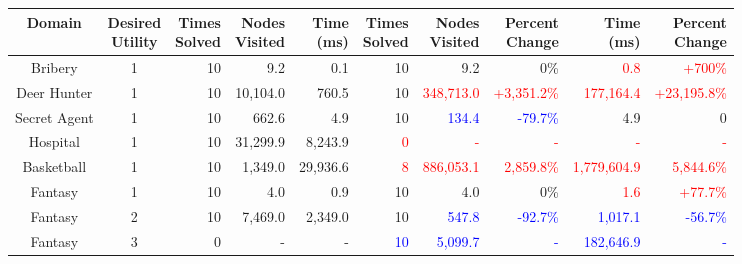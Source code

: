 \documentclass[letterpaper]{article} %
\begin{document}
\begin{table}[t]
\begin{tabular}{|c c | r r r | r r r r r |}
 \hline
 Domain & \shortstack{Desired \\Utility} & \shortstack{Times \\ Solved} & \shortstack{Nodes \\ Visited} & \shortstack{Time \\ (ms)} & \shortstack{Times \\ Solved} & \shortstack{Nodes \\ Visited} & \shortstack{Percent \\ Change} & \shortstack{Time \\ (ms)}  &  \shortstack{Percent \\ Change}\\ [0.5ex] 
 \hline\hline
 
 Bribery & 1 & 10 & 9.2 & 0.1 & 10 & 9.2 & 0\% & \textcolor{red}{0.8} & \textcolor{red}{+700\%} \\ 
 \hline
 
 Deer Hunter & 1 & 10 & 10,104.0 & 760.5 & 10 & \textcolor{red}{348,713.0} & \textcolor{red}{+3,351.2\%} & \textcolor{red}{177,164.4} & \textcolor{red}{+23,195.8\%} \\
 \hline
 
 Secret Agent & 1 & 10 & 662.6 & 4.9 & 10 & \textcolor{blue}{134.4} & \textcolor{blue}{-79.7\%} & 4.9 & 0 \\
 \hline
 
 Hospital & 1 & 10 & 31,299.9 & 8,243.9 & \textcolor{red}{0} & \textcolor{red}{-} & \textcolor{red}{-} & \textcolor{red}{-} & \textcolor{red}{-}\\
 \hline
 
 Basketball & 1 & 10 & 1,349.0 & 29,936.6 & \textcolor{red}{8} & \textcolor{red}{886,053.1} & \textcolor{red}{2,859.8\%} & \textcolor{red}{1,779,604.9} & \textcolor{red}{5,844.6\%}\\
 \hline
 
 Fantasy & 1 & 10 & 4.0 & 0.9 & 10 & 4.0 & 0\% & \textcolor{red}{1.6} & \textcolor{red}{+77.7\%} \\
 \hline
 
 Fantasy & 2 & 10 & 7,469.0 & 2,349.0 & 10 & \textcolor{blue}{547.8} & \textcolor{blue}{-92.7\%} & \textcolor{blue}{1,017.1} & \textcolor{blue}{-56.7\%}\\
 \hline
 
 Fantasy & 3 & 0 & - & - & \textcolor{blue}{10} & \textcolor{blue}{5,099.7} & \textcolor{blue}{-} & \textcolor{blue}{182,646.9} & \textcolor{blue}{-}\\
 \hline
 

\end{tabular}
\end{table}
\end{document}
